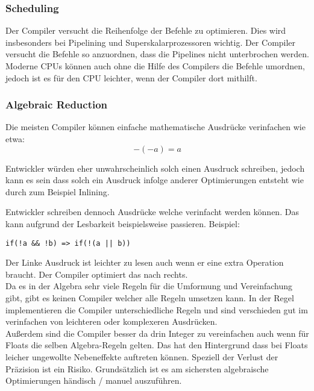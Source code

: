 \documentclass{article}
\begin{document}
\subsubsection{Scheduling}
Der Compiler versucht die Reihenfolge der Befehle zu optimieren. Dies wird insbesonders bei Pipelining und Superskalarprozessoren wichtig. Der Compiler versucht die Befehle so anzuordnen, dass die Pipelines nicht unterbrochen werden. \\
Moderne CPUs können auch ohne die Hilfe des Compilers die Befehle umordnen, jedoch ist es für den CPU leichter, wenn der Compiler dort mithilft.

\subsubsection{Algebraic Reduction}
Die meisten Compiler können einfache mathematische Ausdrücke verinfachen wie etwa: \[
  -(-a) = a
\] 

Entwickler würden eher unwahrscheinlich solch einen Ausdruck schreiben, jedoch kann es sein dass solch ein Ausdruck infolge anderer Optimierungen entsteht wie durch zum Beispiel Inlining.

Entwickler schreiben dennoch Ausdrücke welche verinfacht werden können. Das kann aufgrund der Lesbarkeit beispielsweise passieren. Beispiel: \begin{verbatim}
if(!a && !b) => if(!(a || b)) 
\end{verbatim} 
Der Linke Ausdruck ist leichter zu lesen auch wenn er eine extra Operation braucht. 
Der Compiler optimiert das nach rechts. \\
Da es in der Algebra sehr viele Regeln für die Umformung und Vereinfachung gibt, gibt es keinen Compiler welcher alle Regeln umsetzen kann. In der Regel implementieren die Compiler unterschiedliche Regeln und sind verschieden gut im verinfachen von leichteren oder komplexeren Ausdrücken. \\
Außerdem sind die Compiler besser da drin Integer zu vereinfachen auch wenn für Floats die selben Algebra-Regeln gelten. Das hat den Hintergrund dass bei Floats leicher ungewollte Nebeneffekte auftreten können. Speziell der Verlust der Präzision ist ein Risiko.
Grundsätzlich ist es am sichersten algebraische Optimierungen händisch / manuel auszuführen.
\end{document}
